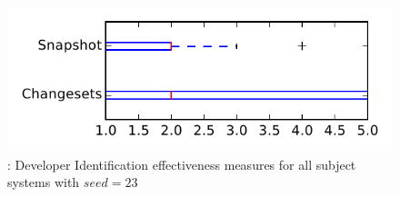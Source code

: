 
\begin{figure}
\centering
\includegraphics[height=0.4\textheight]{figures/dit_seed/rq1_tiny_23}
\caption{\rtwo: Developer Identification effectiveness measures for all subject systems with $seed=23$}
\label{fig:dit_seed:rq1:tiny}
\end{figure}
